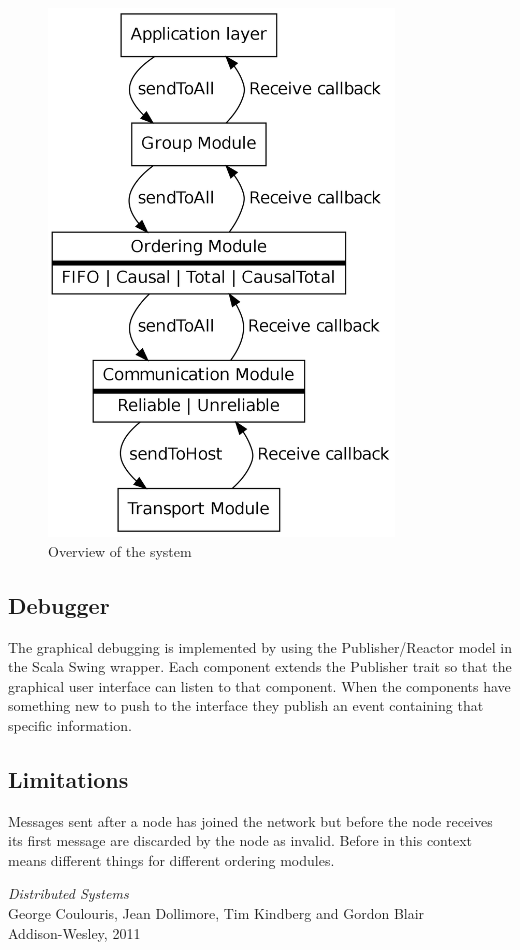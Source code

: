 \documentclass[10pt, oneside]{article}
\begin{document}
\begin{figure}[h]
\centering
\includegraphics[height=14cm]{graph2}
\caption{Overview of the system}
\label{fig:modules}
\end{figure}


\subsection{Debugger}

The graphical debugging is implemented by using the Publisher/Reactor model in
the Scala Swing wrapper. Each component extends the Publisher trait so that the
graphical user interface can listen to that component. When the components have
something new to push to the interface they publish an event containing that
specific information. 

\subsection{Limitations}

Messages sent after a node has joined the network but before the node receives
its first message are discarded by the node as invalid. Before in this context
means different things for different ordering modules.  

\pagebreak

\begin{thebibliography}{9}

 \emph{Distributed Systems}\\
\newblock George Coulouris, Jean Dollimore, Tim Kindberg and Gordon Blair\\
\newblock Addison-Wesley, 2011\\

\end{thebibliography}
\end{document}
